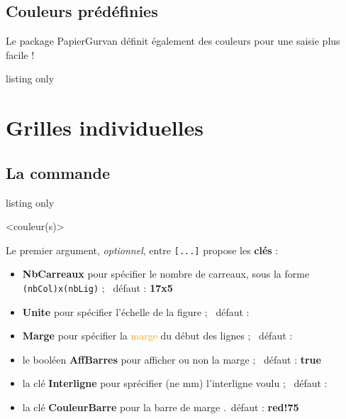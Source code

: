 \documentclass[a4paper]{article}
\newcommand\Cle[1]{{\bfseries\sffamily\textlangle #1\textrangle}}
\begin{document}
\pagebreak

\subsection{Couleurs prédéfinies}

Le package \textsf{PapierGurvan} définit également des couleurs pour une saisie plus facile !

\begin{PresentationCode}{listing only}
\def\ColGgurvan{gray!75/GurvanBleuFonce/GurvanBleuCiel}%
\end{PresentationCode}

\section{Grilles individuelles}

\subsection{La commande}

\begin{PresentationCode}{listing only}

\PapierGurvan[clés]<couleur(s)>
\end{PresentationCode}

Le premier argument, \textit{optionnel}, entre \texttt{[...]} propose les \Cle{clés} :

\begin{itemize}
	\item \Cle{NbCarreaux} pour spécifier le nombre de carreaux, sous la forme \texttt{(nbCol)x(nbLig)} ; \hfill~défaut : \Cle{17x5}
	\item \Cle{Unite} pour spécifier l'échelle de la figure ; \hfill~défaut : \Cle{1}
	\item \Cle{Marge} pour spécifier la \textcolor{orange}{marge} du début des lignes ; \hfill~défaut : \Cle{4}
	\item le booléen \Cle{AffBarres} pour afficher ou non la marge ; \hfill~défaut : \Cle{true}
	\item la clé \Cle{Interligne} pour sprécifier (ne mm) l'interligne voulu ; \hfill~défaut : \Cle{3}
	\item la clé \Cle{CouleurBarre} pour la barre de marge .\hfill~défaut : \Cle{red!75}
\end{itemize}
\end{document}

